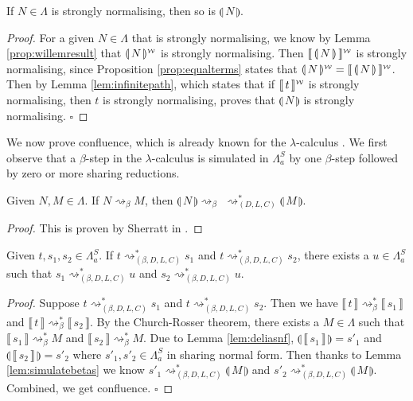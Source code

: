\documentclass[runningheads]{llncs}
\newcommand{\FALC}{\Lambda^{S}_{a}}
\newcommand{\readback}[2]{\llbracket \, #1 \, \rrbracket}
\newcommand{\compile}[1]{\llparenthesis \, #1 \, \rrparenthesis}
\newcommand{\weaksymbol}{\mbox{\tiny $\mathcal{W}$}}
\newcommand{\compweak}[1]{\llparenthesis \, #1 \, \rrparenthesis^{\weaksymbol}}
\newcommand{\composeweak}[1]{\llbracket \, #1 \, \rrbracket^{\weaksymbol}}
\newcommand*{\QEDB}{\hfill\ensuremath{\square}}
\begin{document}
\begin{theorem}
 If $N \in \Lambda$ is strongly normalising, then so is $\compile{N}$.
\end{theorem}

\begin{proof}
For a given $N \in \Lambda$ that is strongly normalising, we know by Lemma \ref{prop:willemresult} that $\compweak{N}$ is strongly normalising. Then $\composeweak{\compile{N}}$ is strongly normalising, since Proposition \ref{prop:equalterms} states that $\compweak{N} = \composeweak{\compile{N}}$. Then by Lemma \ref{lem:infinitepath}, which states that if $\composeweak{t}$ is strongly normalising, then $t$ is strongly normalising, proves that $\compile{N}$ is strongly normalising. \QEDB
\end{proof}

\noindent We now prove confluence, which is already known for the $\lambda$-calculus \cite{churchrossertheorem}. We first observe that a $\beta$-step in the $\lambda$-calculus is simulated in $\FALC$ by one $\beta$-step followed by zero or more sharing reductions. 

\begin{lemma}
\label{lem:simulatebetas}
Given $N, M \in \Lambda$. If $N \rightsquigarrow_{\beta} M$, then $\compile{N}  \rightsquigarrow_{\beta} \, \, \rightsquigarrow^{*}_{(D, L, C)} \compile{M}$.
\end{lemma}

\begin{proof}
This is proven by Sherratt in \cite[Lemma~67]{sherratt2019atomic}.
\end{proof}

\begin{theorem}
Given $t, s_{1}, s_{2} \in \FALC$. If $t \rightsquigarrow^{*}_{(\beta, D, L, C)} s_{1}$ and $t \rightsquigarrow^{*}_{(\beta, D, L, C)} s_{2}$, there exists a $u \in \FALC$ such that $s_{1} \rightsquigarrow^{*}_{(\beta, D, L, C)} u$ and $s_{2} \rightsquigarrow^{*}_{(\beta, D, L, C)} u$.

\end{theorem}

\begin{proof}
Suppose $t \rightsquigarrow^{*}_{(\beta, D, L, C)} s_{1}$ and $t \rightsquigarrow^{*}_{(\beta, D, L, C)} s_{2}$. Then we have $\readback{t}{} \rightsquigarrow^{*}_{\beta} \readback{s_{1}}{}$ and $\readback{t}{} \rightsquigarrow^{*}_{\beta} \readback{s_{2}}{}$. By the Church-Rosser theorem, there exists a $M \in \Lambda$ such that $\readback{s_{1}}{} \rightsquigarrow^{*}_{\beta} M$ and $\readback{s_{2}}{} \rightsquigarrow^{*}_{\beta} M$. Due to Lemma \ref{lem:deliasnf}, $\compile{\readback{s_{1}}{}} = s'_{1}$ and $\compile{\readback{s_{2}}{}} = s'_{2}$ where $s'_{1}, s'_{2} \in \FALC$ in sharing normal form. Then thanks to Lemma \ref{lem:simulatebetas} we know $s'_{1} \rightsquigarrow^{*}_{(\beta, D, L, C)} \compile{M}$ and $s'_{2} \rightsquigarrow^{*}_{(\beta, D, L, C)} \compile{M}$. Combined, we get confluence. \QEDB
\end{proof}
\end{document}
